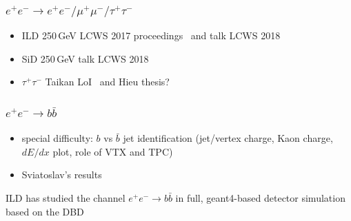\subsubsection{$e^+e^- \to e^+ e^- / \mu^+ \mu^- / \tau^+\tau^-$}
\begin{itemize}
\item ILD 250\,GeV LCWS 2017 proceedings~\cite{Yamashiro:2018ant} and talk LCWS 2018
\item SiD 250\,GeV talk LCWS 2018
\item $\tau^+\tau^-$  Taikan LoI~\cite{Suehara:2009nj} and Hieu thesis?
\end{itemize}

\subsubsection{$e^+e^- \to b\bar{b}$}
\begin{itemize}
\item special difficulty: $b$ vs $\bar{b}$ jet identification (jet/vertex charge, Kaon charge, $dE/dx$ plot, role of VTX and TPC)
\item Sviatoslav's results
\end{itemize}

ILD has studied the channel $e^+e^- \to b\bar{b}$ in full, geant4-based detector simulation based on the DBD

